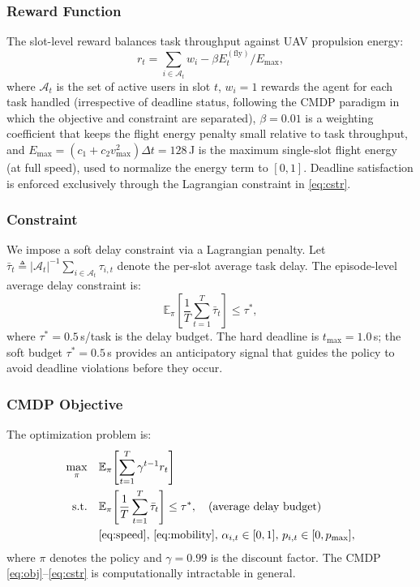 \documentclass[journal]{IEEEtran}
\begin{document}
\subsubsection{Reward Function}
The slot-level reward balances task throughput against UAV
propulsion energy:
\begin{equation}
  r_t = \sum_{i \in \mathcal{A}_t} w_i
        - \beta E^{(\text{fly})}_t / E_{\max},
  \label{eq:reward}
\end{equation}
where $\mathcal{A}_t$ is the set of active users in slot $t$,
$w_i = 1$ rewards the agent for each task handled
(irrespective of deadline status, following the CMDP paradigm
in which the objective and constraint are separated),
$\beta = 0.01$ is a weighting coefficient that keeps the
flight energy penalty small relative to task throughput, and
$E_{\max} = (c_1 + c_2 v_{\max}^2)\Delta t = 128$\,J is the
maximum single-slot flight energy (at full speed), used to
normalize the energy term to $[0,1]$.
Deadline satisfaction is enforced exclusively through the
Lagrangian constraint in \eqref{eq:cstr}.

\subsubsection{Constraint}

We impose a soft delay constraint via a Lagrangian penalty.
Let $\bar{\tau}_t \triangleq |\mathcal{A}_t|^{-1}
\sum_{i \in \mathcal{A}_t} \tau_{i,t}$ denote the per-slot
average task delay.
The episode-level average delay constraint is:
\begin{equation}
  \mathbb{E}_\pi\!\left[\frac{1}{T}\sum_{t=1}^T \bar{\tau}_t\right]
    \le \tau^*,
  \label{eq:constraint}
\end{equation}
where $\tau^* = 0.5$\,s/task is the delay budget.
The hard deadline is $t_{\max} = 1.0$\,s; the soft budget
$\tau^* = 0.5$\,s provides an anticipatory signal that guides
the policy to avoid deadline violations before they occur.

\subsubsection{CMDP Objective}
The optimization problem is:
\begin{align}
  \max_{\pi} \quad & \mathbb{E}_{\pi}\!\left[
    \sum_{t=1}^{T} \gamma^{t-1} r_t \right] \label{eq:obj} \\
  \text{s.t.} \quad & \mathbb{E}_{\pi}\!\left[
    \frac{1}{T}\sum_{t=1}^T \bar{\tau}_t \right] \le \tau^*,
    \quad \text{(average delay budget)} \label{eq:cstr} \\
  & \eqref{eq:speed},\, \eqref{eq:mobility},\,
    \alpha_{i,t} \in [0,1],\, p_{i,t} \in [0, p_{\max}],
    \notag
\end{align}
where $\pi$ denotes the policy and $\gamma = 0.99$ is the
discount factor.
The CMDP \eqref{eq:obj}--\eqref{eq:cstr} is computationally
intractable in general.
\end{document}
